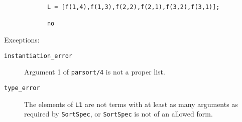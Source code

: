 \begin{description}
{\begin{verbatim}
            L = [f(1,4),f(1,3),f(2,2),f(2,1),f(3,2),f(3,1)];

            no
     \end{verbatim}}
    Exceptions:
    \begin{description}
    \item[{\tt instantiation\_error}]
	Argument 1 of {\tt parsort/4} is not a proper list.
    \item[{\tt type\_error}]
	The elements of {\tt L1} are not terms with at least as many arguments as 
	required by {\tt SortSpec}, or {\tt SortSpec} is not of an allowed form.
    \end{description}
\end{description}


